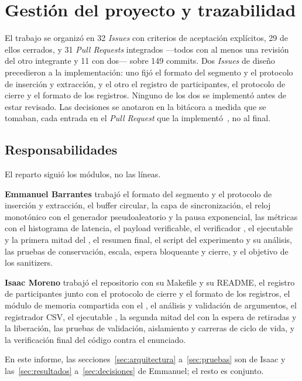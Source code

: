 \section{Gestión del proyecto y trazabilidad}
\label{sec:gestion}

El trabajo se organizó en 32 \emph{Issues} con criterios de aceptación
explícitos, 29 de ellos cerrados, y 31 \emph{Pull Requests} integrados
---todos con al menos una revisión del otro integrante y 11 con dos--- sobre
149 commits. Dos \emph{Issues} de diseño precedieron a la implementación:
uno fijó el formato del segmento y el protocolo de inserción y extracción, y
el otro el registro de participantes, el protocolo de cierre y el formato de
los registros. Ninguno de los dos se implementó antes de estar revisado. Las
decisiones se anotaron en la bitácora a medida que se tomaban, cada entrada
en el \emph{Pull Request} que la implementó~\cite{Bitacora2026}, no al final.

\subsection{Responsabilidades}

El reparto siguió los módulos, no las líneas.

\textbf{Emmanuel Barrantes} trabajó el formato del segmento y el protocolo
de inserción y extracción, el buffer circular, la capa de sincronización, el
reloj monotónico con el generador pseudoaleatorio y la pausa exponencial,
las métricas con el histograma de latencia, el payload verificable, el
verificador , el ejecutable  y la primera mitad
del , el resumen final, el script del experimento y su
análisis, las pruebas de conservación, escala, espera bloqueante y cierre, y
el objetivo de los sanitizers.

\textbf{Isaac Moreno} trabajó el repositorio con su Makefile y su README, el
registro de participantes junto con el protocolo de cierre y el formato de
los registros, el módulo de memoria compartida con el , el
análisis y validación de argumentos, el registrador CSV, el ejecutable
, la segunda mitad del  con la espera de
retiradas y la liberación, las pruebas de validación, aislamiento y carreras
de ciclo de vida, y la verificación final del código contra el enunciado.

En este informe, las secciones~\ref{sec:arquitectura} a~\ref{sec:pruebas}
son de Isaac y las~\ref{sec:resultados} a~\ref{sec:decisiones} de Emmanuel;
el resto es conjunto.

